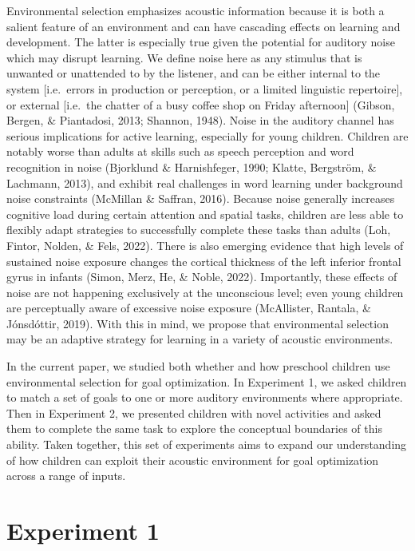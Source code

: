 \documentclass[10pt, letterpaper]{article}
\begin{document}
Environmental selection emphasizes acoustic information because it is
both a salient feature of an environment and can have cascading effects
on learning and development. The latter is especially true given the
potential for auditory noise which may disrupt learning. We define noise
here as any stimulus that is unwanted or unattended to by the listener,
and can be either internal to the system {[}i.e.~errors in production or
perception, or a limited linguistic repertoire{]}, or external
{[}i.e.~the chatter of a busy coffee shop on Friday afternoon{]}
(Gibson, Bergen, \& Piantadosi, 2013; Shannon, 1948). Noise in the
auditory channel has serious implications for active learning,
especially for young children. Children are notably worse than adults at
skills such as speech perception and word recognition in noise
(Bjorklund \& Harnishfeger, 1990; Klatte, Bergström, \& Lachmann, 2013),
and exhibit real challenges in word learning under background noise
constraints (McMillan \& Saffran, 2016). Because noise generally
increases cognitive load during certain attention and spatial tasks,
children are less able to flexibly adapt strategies to successfully
complete these tasks than adults (Loh, Fintor, Nolden, \& Fels, 2022).
There is also emerging evidence that high levels of sustained noise
exposure changes the cortical thickness of the left inferior frontal
gyrus in infants (Simon, Merz, He, \& Noble, 2022). Importantly, these
effects of noise are not happening exclusively at the unconscious level;
even young children are perceptually aware of excessive noise exposure
(McAllister, Rantala, \& Jónsdóttir, 2019). With this in mind, we
propose that environmental selection may be an adaptive strategy for
learning in a variety of acoustic environments.

In the current paper, we studied both whether and how preschool children
use environmental selection for goal optimization. In Experiment 1, we
asked children to match a set of goals to one or more auditory
environments where appropriate. Then in Experiment 2, we presented
children with novel activities and asked them to complete the same task
to explore the conceptual boundaries of this ability. Taken together,
this set of experiments aims to expand our understanding of how children
can exploit their acoustic environment for goal optimization across a
range of inputs.

\hypertarget{experiment-1}{%
\section{Experiment 1}\label{experiment-1}}
\end{document}

